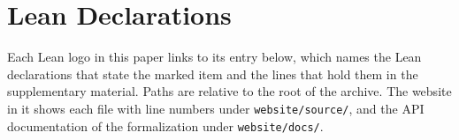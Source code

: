 \ifleananonymous\ifleanlinks
\section{Lean Declarations}
\label{sec:appendix-lean}

Each Lean logo\leanmark{} in this paper links to its entry below, which names the Lean
declarations that state the marked item and the lines that hold them in the supplementary
material. Paths are relative to the root of the archive. The website in it shows each file with
line numbers under \texttt{website/source/}, and the API documentation of the formalization
under \texttt{website/docs/}.

\printleanlinks
\fi\fi
